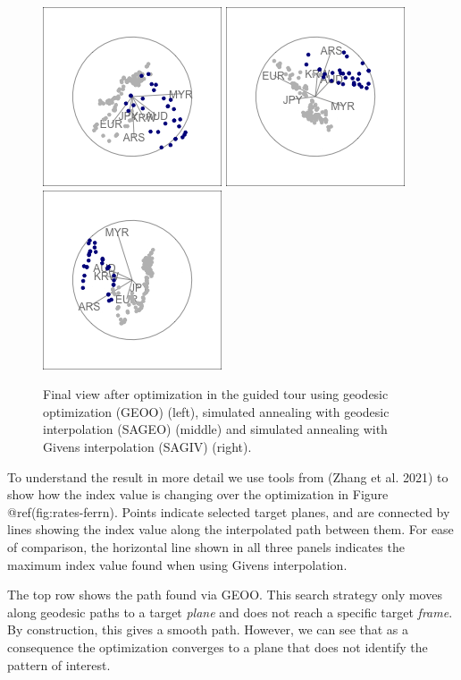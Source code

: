 \documentclass[
]{article}
\begin{document}
\begin{figure}

{\centering \includegraphics[width=0.3\linewidth]{figures/rates_tour_geodesic_final} \includegraphics[width=0.3\linewidth]{figures/rates_tour_better_final} \includegraphics[width=0.3\linewidth]{figures/rates_tour_givens_final} 

}

\caption{Final view after optimization in the guided tour using geodesic optimization  (GEOO) (left), simulated annealing with geodesic interpolation (SAGEO) (middle) and simulated annealing with Givens interpolation (SAGIV) (right).}\label{fig:rates-tour-static}
\end{figure}

To understand the result in more detail we use tools from
 (Zhang et al. 2021) to show how the index value is
changing over the optimization in Figure @ref(fig:rates-ferrn). Points
indicate selected target planes, and are connected by lines showing the
index value along the interpolated path between them. For ease of
comparison, the horizontal line shown in all three panels indicates the
maximum index value found when using Givens interpolation.

The top row shows the path found via GEOO. This search strategy only
moves along geodesic paths to a target \emph{plane} and does not reach a
specific target \emph{frame}. By construction, this gives a smooth path.
However, we can see that as a consequence the optimization converges to
a plane that does not identify the pattern of interest.
\end{document}
